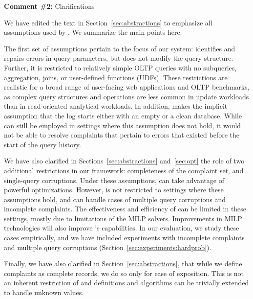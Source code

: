  
\comskip

\noindent
\textbf{Comment \#2:} Clarifications
\begin{quote}
\end{quote}

We have edited the text in Section~\ref{sec:abstractions} to emphasize all assumptions used by \sys.  We summarize the main points here.

The first set of assumptions pertain to the focus of our system: \sys
identifies and repairs errors in query parameters, but does not modify the
query structure. Further, it is restricted to relatively simple OLTP queries
with no subqueries, aggregation, joins, or user-defined functions (UDFs).
These restrictions are realistic for a broad range of user-facing web
applications and OLTP benchmarks, as complex query structures and operations
are less common in update workloads than in read-oriented analytical
workloads. In addition, \sys makes the implicit assumption that the log starts
either with an empty or a clean database. While \sys can still be employed in
settings where this assumption does not hold, it would not be able to resolve
complaints that pertain to errors that existed before the start of the query
history.

We have also clarified in Sections~\ref{sec:abstractions} and~\ref{sec:opt}
the role of two additional restrictions in our framework: completeness of the
complaint set, and single-query corruptions. Under these assumptions, \sys can
take advantage of powerful optimizations. However, \sys is not restricted to
settings where these assumptions hold, and can handle cases of multiple query
corruptions and incomplete complaints. The effectiveness and efficiency of
\sys can be limited in these settings, mostly due to limitations of the MILP
solvers. Improvements in MILP technologies will also improve \sys's
capabilities. In our evaluation, we study these cases empirically, and we have
included experiments with incomplete complaints and multiple query corruptions
(Section~\ref{sec:experiments:hardprob}).

Finally, we have also clarified in Section~\ref{sec:abstractions}, that while
we define complaints as complete records, we do so only for ease of
exposition. This is not an inherent restriction of \sys and definitions and
algorithms can be trivially extended to handle unknown values.



